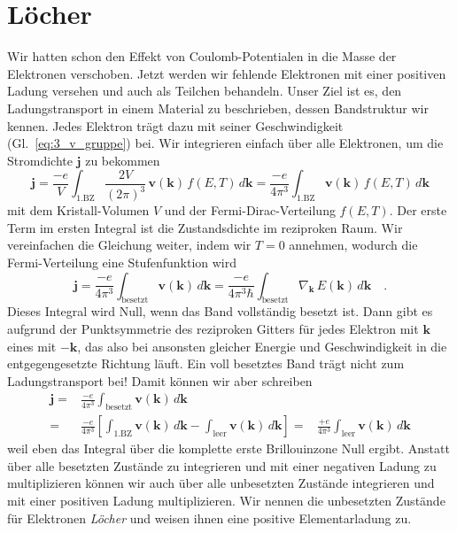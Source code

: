 \section{Löcher}

Wir hatten schon den Effekt von Coulomb-Potentialen in die Masse der Elektronen verschoben. Jetzt werden wir fehlende Elektronen mit einer positiven Ladung versehen und auch als Teilchen behandeln. Unser Ziel ist es, den Ladungstransport in einem Material zu beschrieben, dessen Bandstruktur wir kennen. Jedes Elektron trägt dazu mit seiner Geschwindigkeit (Gl.~\ref{eq:3_v_gruppe}) bei. Wir integrieren einfach über alle Elektronen, um die Stromdichte $\mathbf{j}$ zu bekommen
\begin{equation}
   \mathbf{j} = \frac{-e}{V} \int_\text{1.BZ} \frac{2V}{(2\pi)^3} \, \mathbf{v}(\mathbf{k}) \, f(E,T) \, d\mathbf{k}
   =  \frac{-e}{4 \pi^3} \int_\text{1.BZ}  \mathbf{v}(\mathbf{k}) \, f(E,T) \, d\mathbf{k}
\end{equation}
mit dem Kristall-Volumen $V$ und der Fermi-Dirac-Verteilung $f(E,T)$. Der erste Term im ersten Integral ist die Zustandsdichte im reziproken Raum. Wir vereinfachen die Gleichung weiter, indem wir $T=0$ annehmen, wodurch die Fermi-Verteilung eine Stufenfunktion wird
\begin{equation}
   \mathbf{j} =  \frac{-e}{4 \pi^3} \int_\text{besetzt}   \mathbf{v}(\mathbf{k}) \, d\mathbf{k} 
   =  \frac{-e}{4 \pi^3 \hbar} \int_\text{besetzt}  \nabla_\mathbf{k} \, E(\mathbf{k}) \, d\mathbf{k}  \quad .
\end{equation}
Dieses Integral wird Null, wenn das Band vollständig besetzt ist. Dann gibt es aufgrund der Punktsymmetrie des reziproken Gitters für jedes Elektron mit $\mathbf{k}$ eines mit $-\mathbf{k}$, das also bei ansonsten gleicher Energie und Geschwindigkeit in die entgegengesetzte Richtung läuft. Ein voll besetztes Band trägt nicht zum Ladungstransport bei! Damit können wir aber schreiben
\begin{eqnarray}
   \mathbf{j} = &  \frac{-e}{4 \pi^3} \int_\text{besetzt}   \mathbf{v}(\mathbf{k}) \, d\mathbf{k}  \\
  =  &  \frac{-e}{4 \pi^3} \left[  \int_\text{1.BZ}   \mathbf{v}(\mathbf{k}) \, d\mathbf{k} -  \int_\text{leer}   \mathbf{v}(\mathbf{k}) \, d\mathbf{k} \right]
  =  &  \frac{+e}{4 \pi^3}  \int_\text{leer}   \mathbf{v}(\mathbf{k}) \, d\mathbf{k} 
\end{eqnarray}
weil eben das Integral über die komplette erste Brillouinzone Null ergibt. Anstatt über alle besetzten Zustände zu integrieren und mit einer negativen Ladung zu multiplizieren können wir auch über alle unbesetzten Zustände integrieren und mit einer positiven Ladung multiplizieren. Wir nennen die unbesetzten Zustände für Elektronen \emph{Löcher} und weisen ihnen eine positive Elementarladung zu.

